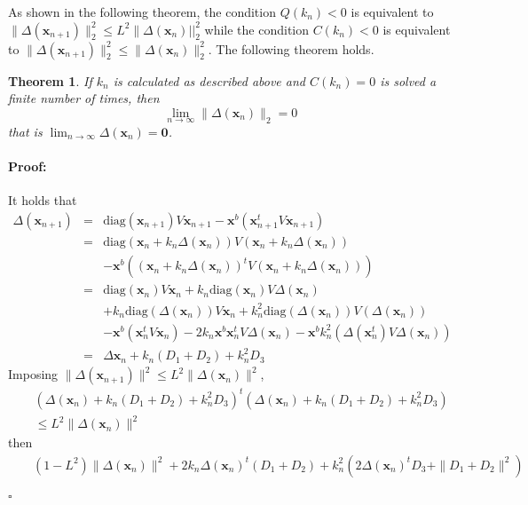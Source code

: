 \documentclass[preprint,11pt,authoryear]{elsarticle}
\newtheorem{theorem}{Theorem}%
\newenvironment{proof}{\paragraph{Proof:}}{\hfill$\square$}
\begin{document}
As shown in the following theorem, the condition $Q(k_n)<0$ is equivalent to $\|\Delta(\mathbf{x}_{n+1})\|_2^2 \le L^2 \|\Delta(\mathbf{x}_n)||_2^2$ while the condition $C(k_n) < 0$ is equivalent to $\|\Delta(\mathbf{x}_{n+1})\|_2^2 \le \|\Delta(\mathbf{x}_n)\|_2^2$.
The following theorem holds. 
\begin{theorem}\label{lim_delta}
If $k_n$ is calculated as described above and $C(k_n) = 0$ is solved a finite number of times, then 
$$\lim_{n \rightarrow \infty} \|\Delta (\mathbf{x}_n)\|_2=0 \,$$
that is $\lim_{n \rightarrow \infty} \Delta (\mathbf{x}_n)=\mathbf{0}$.
\end{theorem}
\begin{proof}
It holds that 
\begin{eqnarray*}
\Delta (\mathbf{x}_{n+1})&=& \textrm{diag}(\mathbf{x}_{n+1}) V \mathbf{x}_{n+1} - \mathbf{x}^b (\mathbf{x}_{n+1}^t V \mathbf{x}_{n+1}) \\
&=& \textrm{diag}(\mathbf{x}_n +k_n \Delta (\mathbf{x}_n)) V (\mathbf{x}_n + k_n \Delta (\mathbf{x}_n)) \\
&&- \mathbf{x}^b \left ((\mathbf{x}_n +k_n \Delta (\mathbf{x}_n))^t V (\mathbf{x}_n + k_n \Delta (\mathbf{x}_n))\right ) \\
&=&  \textrm{diag}(\mathbf{x}_n ) V \mathbf{x}_n + k_n \textrm{diag}(\mathbf{x}_n ) V \Delta (\mathbf{x}_n) \\
&&+ k_n \textrm{diag}( \Delta (\mathbf{x}_n)) V \mathbf{x}_n  +
k_n^2 \textrm{diag}(\Delta (\mathbf{x}_n)) V (\Delta (\mathbf{x}_n)) \\
&&- \mathbf{x}^b \left (\mathbf{x}_n ^t V \mathbf{x}_n \right )  - 2 k_n \mathbf{x}^b \mathbf{x}_n^t V \Delta (\mathbf{x}_n) -\mathbf{x}^b k_n^2 \left (\Delta (\mathbf{x}_n^t)  V \Delta (\mathbf{x}_n)\right ) \\
&=& \Delta \mathbf{x}_n + k_n (D_1 +D_2) + k_n^2 D_3 
\end{eqnarray*}
Imposing $\|\Delta (\mathbf{x}_{n+1}) \|^2\le L^2  \|\Delta (\mathbf{x}_n)\|^2$,
\begin{eqnarray*}
&&\left ( \Delta (\mathbf{x}_n) + k_n (D_1 +D_2) + k_n^2 D_3\right)^t\left ( \Delta (\mathbf{x}_n) + k_n (D_1 +D_2) + k_n^2 D_3\right ) \\
&&\le L^2  \|\Delta (\mathbf{x}_n)\|^2  %
\end{eqnarray*}
then
\begin{eqnarray*}
&&(1-L^2)\|\Delta (\mathbf{x}_n) \|^2 + 2 k_n \Delta (\mathbf{x}_n)^t (D_1+D_2)  + k_n^2 (2\Delta (\mathbf{x}_n)^t D_3 + \|D_1+D_2\|^2) \\

\end{eqnarray*}
\end{proof}
\end{document}
